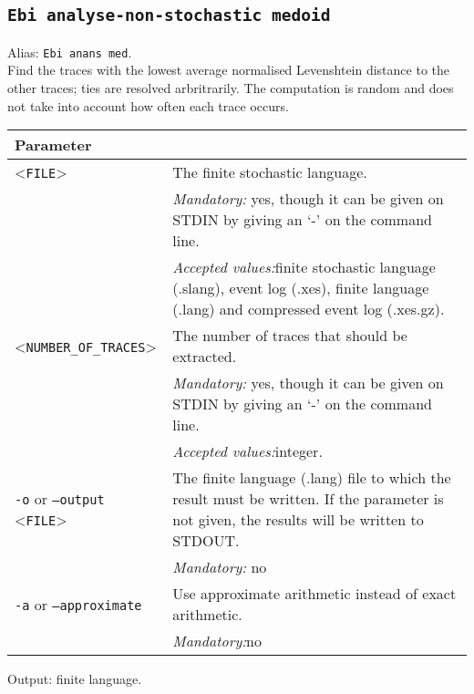 {\subsection{\texttt{Ebi analyse-non-stochastic medoid}}
\label{command:Ebi analyse-non-stochastic medoid}
Alias: \texttt{Ebi anans med}.\\
Find the traces with the lowest average normalised Levenshtein distance to the other traces; ties are resolved arbritrarily. The computation is random and does not take into account how often each trace occurs.\\
\begin{tabularx}{\linewidth}{lX}
\toprule
Parameter \\\midrule
<\texttt{FILE}>&The finite stochastic language.\\
&\textit{Mandatory:} \quad yes, though it can be given on STDIN by giving an `-' on the command line.\\
&\textit{Accepted values:}\quad finite stochastic language (.slang), event log (.xes), finite language (.lang) and compressed event log (.xes.gz).\\
<\texttt{NUMBER\_OF\_TRACES}>&The number of traces that should be extracted.\\
&\textit{Mandatory:} \quad yes, though it can be given on STDIN by giving an `-' on the command line.\\
&\textit{Accepted values:}\quad integer.\\
\texttt{-o} or \texttt{--output} <\texttt{FILE}> &
The finite language (.lang) file to which the result must be written. If the parameter is not given, the results will be written to STDOUT.\\
&\textit{Mandatory:} \quad no\\
\texttt{-a} or \texttt{--approximate} & Use approximate arithmetic instead of exact arithmetic.\\
&\textit{Mandatory:}\quad no\\
\bottomrule
\end{tabularx}
Output: finite language.
}

